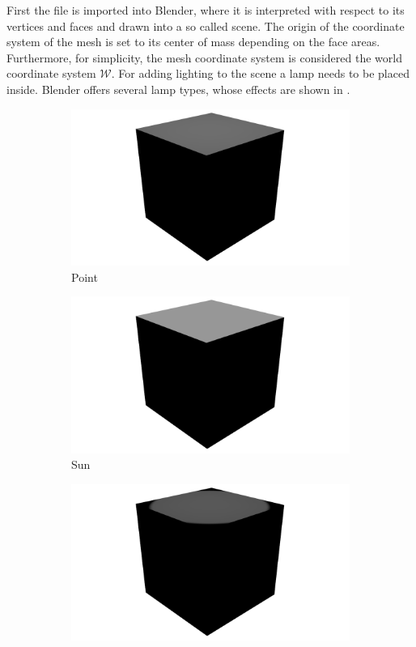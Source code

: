 First the file is imported into Blender, where it is interpreted with respect to its vertices and faces and drawn into a so called scene.
The origin of the coordinate system of the mesh is set to its center of mass depending on the face areas.
Furthermore, for simplicity, the mesh coordinate system is considered the world coordinate system $\mathcal{W}$.
For adding lighting to the scene a lamp needs to be placed inside.
Blender offers several lamp types, whose effects are shown in .
\begin{figure}
	\centering
	\begin{subfigure}{0.19\textwidth}
		\centering
		\includegraphics[width=\textwidth]{images/point.png}
		\caption{Point}
	\end{subfigure}
	\begin{subfigure}{0.19\textwidth}
		\centering
		\includegraphics[width=\textwidth]{images/sun.png}
		\caption{Sun}
	\end{subfigure}
	\begin{subfigure}{0.19\textwidth}
		\centering
		\includegraphics[width=\textwidth]{images/spot.png}

\end{subfigure}
\end{figure}
